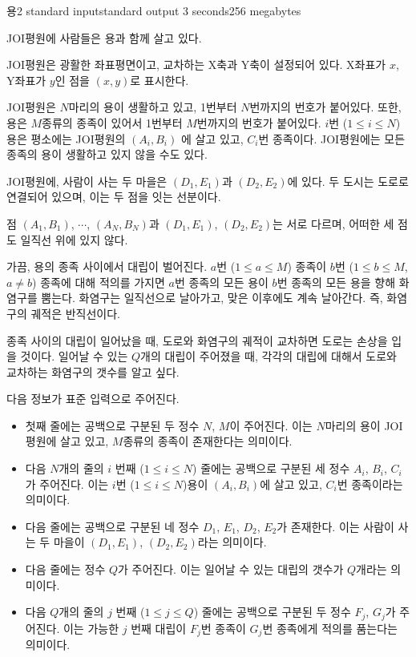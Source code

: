 \begin{problem}{용2}
	{standard input}{standard output}
	{3 seconds}{256 megabytes}{}
	
	JOI평원에 사람들은 용과 함께 살고 있다.
	
	JOI평원은 광활한 좌표평면이고, 교차하는 X축과 Y축이 설정되어 있다. X좌표가 $x$, Y좌표가 $y$인 점을 $(x, y)$로 표시한다.
	
	JOI평원은 $N$마리의 용이 생활하고 있고, 1번부터 $N$번까지의 번호가 붙어있다. 또한, 용은 $M$종류의 종족이 있어서 1번부터 $M$번까지의 번호가 붙어있다. $i$번 ($1 \le i \le N$) 용은 평소에는 JOI평원의 $(A_i, B_i)$ 에 살고 있고, $C_i$번 종족이다. JOI평원에는 모든 종족의 용이 생활하고 있지 않을 수도 있다.
	
	JOI평원에, 사람이 사는 두 마을은 $(D_1, E_1)$과 $(D_2, E_2)$에 있다. 두 도시는 도로로 연결되어 있으며, 이는 두 점을 잇는 선분이다.
	
	점 $(A_1, B_1)$, $\cdots$, $(A_N, B_N)$과 $(D_1, E_1)$, $(D_2, E_2)$는 서로 다르며, 어떠한 세 점도 일직선 위에 있지 않다.
	
	가끔, 용의 종족 사이에서 대립이 벌어진다. $a$번 ($1 \le a \le M$) 종족이 $b$번 ($1 \le b \le M$, $a \ne b$) 종족에 대해 적의를 가지면 $a$번 종족의 모든 용이 $b$번 종족의 모든 용을 향해 화염구를 뿜는다. 화염구는 일직선으로 날아가고, 맞은 이후에도 계속 날아간다. 즉, 화염구의 궤적은 반직선이다.
	
	종족 사이의 대립이 일어났을 때, 도로와 화염구의 궤적이 교차하면 도로는 손상을 입을 것이다. 일어날 수 있는 $Q$개의 대립이 주어졌을 때, 각각의 대립에 대해서 도로와 교차하는 화염구의 갯수를 알고 싶다.
	
	\InputFile
	
	다음 정보가 표준 입력으로 주어진다.
	
	\begin{itemize}
		\item 첫째 줄에는 공백으로 구분된 두 정수 $N$, $M$이 주어진다. 이는 $N$마리의 용이 JOI 평원에 살고 있고, $M$종류의 종족이 존재한다는 의미이다.
		\item 다음 $N$개의 줄의 $i$ 번째 ($1 \le i \le N$) 줄에는 공백으로 구분된 세 정수 $A_i$, $B_i$, $C_i$가 주어진다. 이는 $i$번 ($1 \le i \le N$)용이 $(A_i, B_i)$에 살고 있고, $C_i$번 종족이라는 의미이다.
		\item 다음 줄에는 공백으로 구분된 네 정수 $D_1$, $E_1$, $D_2$, $E_2$가 존재한다. 이는 사람이 사는 두 마을이 $(D_1, E_1)$, $(D_2, E_2)$라는 의미이다.
		\item 다음 줄에는 정수 $Q$가 주어진다. 이는 일어날 수 있는 대립의 갯수가 $Q$개라는 의미이다.
		\item 다음 $Q$개의 줄의 $j$ 번째 ($1 \le j \le Q$) 줄에는 공백으로 구분된 두 정수 $F_j$, $G_j$가 주어진다. 이는 가능한 $j$ 번째 대립이 $F_j$번 종족이 $G_j$번 종족에게 적의를 품는다는 의미이다.
	\end{itemize}
	

\end{problem}
